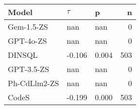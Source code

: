 \begin{tabular}{lllr}
\toprule
Model & $\tau$ & p & n \\
\midrule
Gem-1.5-ZS & nan & nan & 0 \\
GPT-4o-ZS & nan & nan & 0 \\
DINSQL & -0.106 & 0.004 & 503 \\
GPT-3.5-ZS & nan & nan & 0 \\
Ph-CdLlm2-ZS & nan & nan & 0 \\
CodeS & -0.199 & 0.000 & 503 \\
\bottomrule
\end{tabular}
